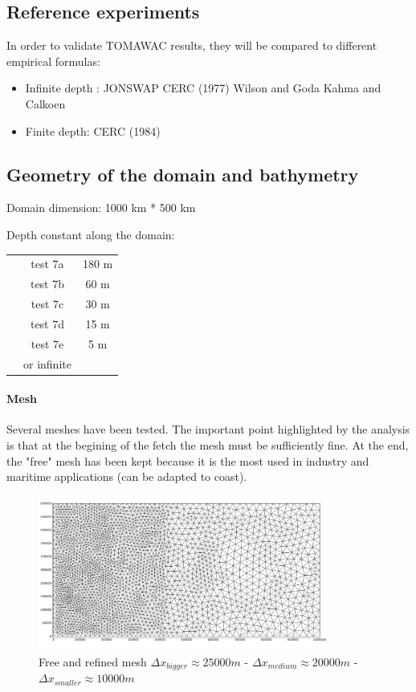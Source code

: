 \subsection{Reference experiments}
In order to validate TOMAWAC results, they will be compared to different empirical formulas:
\begin{itemize}
\item Infinite depth :
\subitem JONSWAP \cite{Hasselmann1973}
\subitem CERC (1977) \cite{CERC77}
\subitem Wilson and Goda \cite{Wilson1965}
\subitem Kahma and Calkoen \cite{Kahma1992}
\item Finite depth:
\subitem CERC (1984)\cite{CERC84}
\end{itemize}
\subsection{Geometry of the domain and bathymetry}
Domain  dimension: 1000 km * 500 km

Depth constant along the domain:
\begin{tabular}{ccc}
 & test 7a & 180 m\\
 & test 7b & 60 m\\
& test 7c & 30 m\\
& test 7d & 15 m\\
& test 7e & 5 m\\
 & or infinite\\
\end{tabular}
\paragraph{Mesh}
Several meshes have been tested. The important point highlighted by the analysis is that at the begining of the fetch the mesh must be sufficiently fine. At the end, the "free" mesh has been kept because it is the most used in industry and maritime applications (can be adapted to coast).
\begin{figure}[H]
\centering
\includegraphics[width=0.85\textwidth]{freemesh.png}
\caption{Free and refined mesh $\Delta x_{bigger} \approx 25 000 m$ - $\Delta x_{medium} \approx 20 000 m$ - $\Delta x_{smaller} \approx 10 000 m$}
\label{meshfet}
\end{figure}

